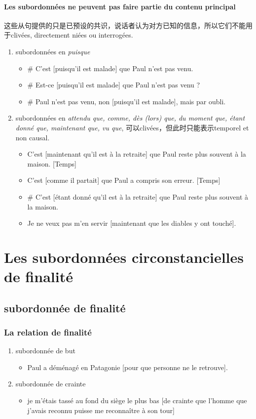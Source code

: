 \documentclass[UTF8]{report}
\begin{document}
\paragraph{Les subordonnées ne peuvent pas faire partie du contenu principal}
这些从句提供的只是已预设的共识，说话者认为对方已知的信息，所以它们不能用于clivées, directement niées ou interrogées.
\begin{enumerate}
    \item subordonnées en \textit{puisque}
    \begin{itemize}
        \item \# C’est [puisqu’il est malade] que Paul n’est pas venu.
        \item \# Est-ce [puisqu’il est malade] que Paul n’est pas venu ?
        \item \# Paul n’est pas venu, non [puisqu’il est malade], mais par oubli.
    \end{itemize}
    \item subordonnées en \textit{attendu que, comme, dès (lors) que, du moment que, étant donné que, maintenant que, vu que}, 可以clivées，但此时只能表示temporel et non causal.
    \begin{itemize}
        \item C’est [maintenant qu’il est à la retraite] que Paul reste plus souvent à la maison. [Temps]
        \item C’est [comme il partait] que Paul a compris son erreur. [Temps]
        \item \# C’est [étant donné qu’il est à la retraite] que Paul reste plus souvent à la maison.
        \item Je ne veux pas m’en servir [maintenant que les diables y ont touché]. 
    \end{itemize}
\end{enumerate}


\section{Les subordonnées circonstancielles de finalité}
\subsection{subordonnée de finalité}
\subsubsection{La relation de finalité}
\begin{enumerate}
    \item subordonnée de but
    \begin{itemize}
        \item Paul a déménagé en Patagonie [pour que personne ne le retrouve].
    \end{itemize}
    \item subordonnée de crainte
    \begin{itemize}
        \item je m’étais tassé au fond du siège le plus bas [de crainte que l’homme que j’avais reconnu puisse me reconnaître à son tour]
    \end{itemize}
\end{enumerate}
\end{document}
